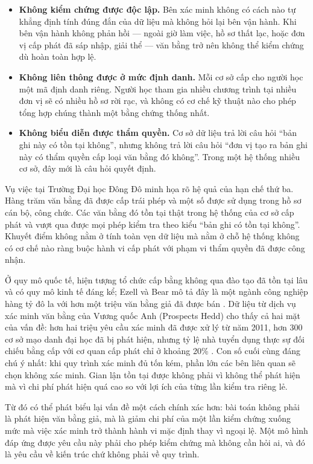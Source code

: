 \begin{itemize}
    \item \textbf{Không kiểm chứng được độc lập.} Bên xác minh không có cách nào tự khẳng định tính đúng đắn của dữ liệu mà không hỏi lại bên vận hành. Khi bên vận hành không phản hồi --- ngoài giờ làm việc, hồ sơ thất lạc, hoặc đơn vị cấp phát đã sáp nhập, giải thể --- văn bằng trở nên không thể kiểm chứng dù hoàn toàn hợp lệ.
    \item \textbf{Không liên thông được ở mức định danh.} Mỗi cơ sở cấp cho người học một mã định danh riêng. Người học tham gia nhiều chương trình tại nhiều đơn vị sẽ có nhiều hồ sơ rời rạc, và không có cơ chế kỹ thuật nào cho phép tổng hợp chúng thành một bằng chứng thống nhất.
    \item \textbf{Không biểu diễn được thẩm quyền.} Cơ sở dữ liệu trả lời câu hỏi {``}bản ghi này có tồn tại không{''}, nhưng không trả lời câu hỏi {``}đơn vị tạo ra bản ghi này có thẩm quyền cấp loại văn bằng đó không{''}. Trong một hệ thống nhiều cơ sở, đây mới là câu hỏi quyết định.
\end{itemize}

Vụ việc tại Trường Đại học Đông Đô minh họa rõ hệ quả của hạn chế thứ ba. Hàng trăm văn bằng đã được cấp trái phép và một số được sử dụng trong hồ sơ cán bộ, công chức. Các văn bằng đó tồn tại thật trong hệ thống của cơ sở cấp phát và vượt qua được mọi phép kiểm tra theo kiểu {``}bản ghi có tồn tại không{''}. Khuyết điểm không nằm ở tính toàn vẹn dữ liệu mà nằm ở chỗ hệ thống không có cơ chế nào ràng buộc hành vi cấp phát với phạm vi thẩm quyền đã được công nhận.

Ở quy mô quốc tế, hiện tượng tổ chức cấp bằng không qua đào tạo đã tồn tại lâu và có quy mô kinh tế đáng kể; Ezell và Bear mô tả đây là một ngành công nghiệp hàng tỷ đô la với hơn một triệu văn bằng giả đã được bán \cite{EzellBear2012}. Dữ liệu từ dịch vụ xác minh văn bằng của Vương quốc Anh (Prospects Hedd) cho thấy cả hai mặt của vấn đề: hơn hai triệu yêu cầu xác minh đã được xử lý từ năm 2011, hơn 300 cơ sở mạo danh đại học đã bị phát hiện, nhưng tỷ lệ nhà tuyển dụng thực sự đối chiếu bằng cấp với cơ quan cấp phát chỉ ở khoảng 20\% \cite{Prospects_Hedd2026}. Con số cuối cùng đáng chú ý nhất: khi quy trình xác minh đủ tốn kém, phần lớn các bên liên quan sẽ chọn không xác minh. Gian lận tồn tại được không phải vì không thể phát hiện mà vì chi phí phát hiện quá cao so với lợi ích của từng lần kiểm tra riêng lẻ.

Từ đó có thể phát biểu lại vấn đề một cách chính xác hơn: bài toán không phải là phát hiện văn bằng giả, mà là giảm chi phí của một lần kiểm chứng xuống mức mà việc xác minh trở thành hành vi mặc định thay vì ngoại lệ. Một mô hình đáp ứng được yêu cầu này phải cho phép kiểm chứng mà không cần hỏi ai, và đó là yêu cầu về kiến trúc chứ không phải về quy trình.

